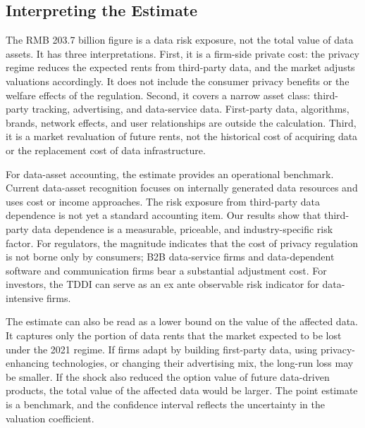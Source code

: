 \subsection{Interpreting the Estimate}

The RMB 203.7 billion figure is a data risk exposure, not the total value of data assets. It has three interpretations. First, it is a firm-side private cost: the privacy regime reduces the expected rents from third-party data, and the market adjusts valuations accordingly. It does not include the consumer privacy benefits or the welfare effects of the regulation. Second, it covers a narrow asset class: third-party tracking, advertising, and data-service data. First-party data, algorithms, brands, network effects, and user relationships are outside the calculation. Third, it is a market revaluation of future rents, not the historical cost of acquiring data or the replacement cost of data infrastructure.

For data-asset accounting, the estimate provides an operational benchmark. Current data-asset recognition focuses on internally generated data resources and uses cost or income approaches. The risk exposure from third-party data dependence is not yet a standard accounting item. Our results show that third-party data dependence is a measurable, priceable, and industry-specific risk factor. For regulators, the magnitude indicates that the cost of privacy regulation is not borne only by consumers; B2B data-service firms and data-dependent software and communication firms bear a substantial adjustment cost. For investors, the TDDI can serve as an ex ante observable risk indicator for data-intensive firms.

The estimate can also be read as a lower bound on the value of the affected data. It captures only the portion of data rents that the market expected to be lost under the 2021 regime. If firms adapt by building first-party data, using privacy-enhancing technologies, or changing their advertising mix, the long-run loss may be smaller. If the shock also reduced the option value of future data-driven products, the total value of the affected data would be larger. The point estimate is a benchmark, and the confidence interval reflects the uncertainty in the valuation coefficient.


